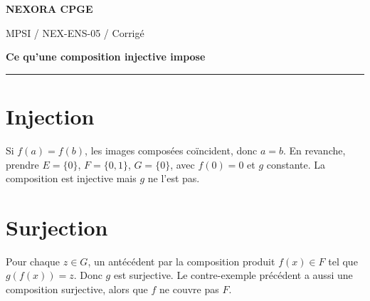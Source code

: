 \documentclass[11pt,a4paper]{article}
\begin{document}
{\small\bfseries\color{nexorablue} NEXORA CPGE}\par
{\small MPSI / NEX-ENS-05 / Corrigé}\par
{\LARGE\bfseries Ce qu’une composition injective impose}\par
\vspace{0.25em}\hrule\vspace{0.6em}

\section*{Injection}
Si $f(a)=f(b)$, les images composées coïncident, donc $a=b$. En revanche, prendre $E=\{0\}$, $F=\{0,1\}$, $G=\{0\}$, avec $f(0)=0$ et $g$ constante. La composition est injective mais $g$ ne l’est pas.

\section*{Surjection}
Pour chaque $z\in G$, un antécédent par la composition produit $f(x)\in F$ tel que $g(f(x))=z$. Donc $g$ est surjective. Le contre-exemple précédent a aussi une composition surjective, alors que $f$ ne couvre pas $F$.
\end{document}
